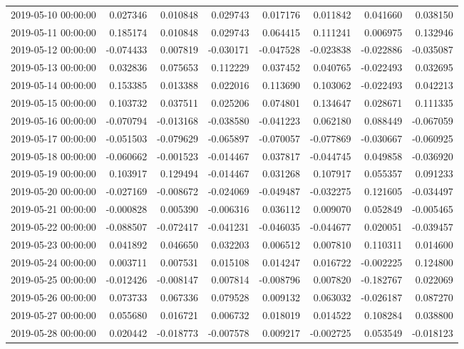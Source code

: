 \begin{tabular}{lrrrrrrr}
2019-05-10 00:00:00 & 0.027346 & 0.010848 & 0.029743 & 0.017176 & 0.011842 & 0.041660 & 0.038150 \\
2019-05-11 00:00:00 & 0.185174 & 0.010848 & 0.029743 & 0.064415 & 0.111241 & 0.006975 & 0.132946 \\
2019-05-12 00:00:00 & -0.074433 & 0.007819 & -0.030171 & -0.047528 & -0.023838 & -0.022886 & -0.035087 \\
2019-05-13 00:00:00 & 0.032836 & 0.075653 & 0.112229 & 0.037452 & 0.040765 & -0.022493 & 0.032695 \\
2019-05-14 00:00:00 & 0.153385 & 0.013388 & 0.022016 & 0.113690 & 0.103062 & -0.022493 & 0.042213 \\
2019-05-15 00:00:00 & 0.103732 & 0.037511 & 0.025206 & 0.074801 & 0.134647 & 0.028671 & 0.111335 \\
2019-05-16 00:00:00 & -0.070794 & -0.013168 & -0.038580 & -0.041223 & 0.062180 & 0.088449 & -0.067059 \\
2019-05-17 00:00:00 & -0.051503 & -0.079629 & -0.065897 & -0.070057 & -0.077869 & -0.030667 & -0.060925 \\
2019-05-18 00:00:00 & -0.060662 & -0.001523 & -0.014467 & 0.037817 & -0.044745 & 0.049858 & -0.036920 \\
2019-05-19 00:00:00 & 0.103917 & 0.129494 & -0.014467 & 0.031268 & 0.107917 & 0.055357 & 0.091233 \\
2019-05-20 00:00:00 & -0.027169 & -0.008672 & -0.024069 & -0.049487 & -0.032275 & 0.121605 & -0.034497 \\
2019-05-21 00:00:00 & -0.000828 & 0.005390 & -0.006316 & 0.036112 & 0.009070 & 0.052849 & -0.005465 \\
2019-05-22 00:00:00 & -0.088507 & -0.072417 & -0.041231 & -0.046035 & -0.044677 & 0.020051 & -0.039457 \\
2019-05-23 00:00:00 & 0.041892 & 0.046650 & 0.032203 & 0.006512 & 0.007810 & 0.110311 & 0.014600 \\
2019-05-24 00:00:00 & 0.003711 & 0.007531 & 0.015108 & 0.014247 & 0.016722 & -0.002225 & 0.124800 \\
2019-05-25 00:00:00 & -0.012426 & -0.008147 & 0.007814 & -0.008796 & 0.007820 & -0.182767 & 0.022069 \\
2019-05-26 00:00:00 & 0.073733 & 0.067336 & 0.079528 & 0.009132 & 0.063032 & -0.026187 & 0.087270 \\
2019-05-27 00:00:00 & 0.055680 & 0.016721 & 0.006732 & 0.018019 & 0.014522 & 0.108284 & 0.038800 \\
2019-05-28 00:00:00 & 0.020442 & -0.018773 & -0.007578 & 0.009217 & -0.002725 & 0.053549 & -0.018123 \\

\end{tabular}
